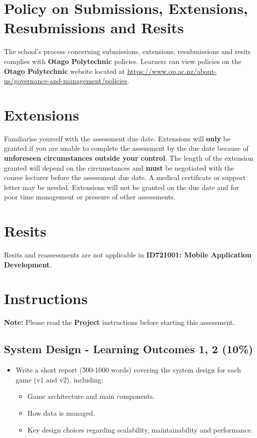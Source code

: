 \documentclass{article}
\begin{document}
\section*{Policy on Submissions, Extensions, Resubmissions and Resits}
The school's process concerning submissions, extensions, resubmissions and resits complies with \textbf{Otago Polytechnic} policies. Learners can view policies on the \textbf{Otago Polytechnic} website located at \href{https://www.op.ac.nz/about-us/governance-and-management/policies}{https://www.op.ac.nz/about-us/governance-and-management/policies}. 

\section*{Extensions}
Familiarise yourself with the assessment due date. Extensions will \textbf{only} be granted if you are unable to complete the assessment by the due date because of \textbf{unforeseen circumstances outside your control}. The length of the extension granted will depend on the circumstances and \textbf{must} be negotiated with the course lecturer before the assessment due date. A medical certificate or support letter may be needed. Extensions will not be granted on the due date and for poor time management or pressure of other assessments.

\section*{Resits}
Resits and reassessments are not applicable in \textbf{ID721001: Mobile Application Development}.

\section*{Instructions}

\textbf{Note:} Please read the \textbf{Project} instructions before starting this assessment. 

\subsection*{System Design - Learning Outcomes 1, 2 (10\%)}
\begin{itemize}
  \item Write a short report (500-1000 words) covering the system design for each game (v1 and v2), including:
  \begin{itemize}
    \item Game architecture and main components.
    \item How data is managed.
    \item Key design choices regarding scalability, maintainability and performance.
  \end{itemize}
\end{itemize}
\end{document}
